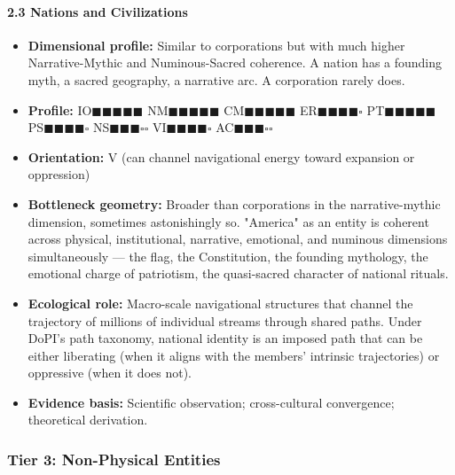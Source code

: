 \paragraph*{2.3 Nations and Civilizations}

\begin{itemize}[nosep,leftmargin=*]
  \item \textbf{Dimensional profile:} Similar to corporations but with much higher Narrative-Mythic and Numinous-Sacred coherence. A nation has a founding myth, a sacred geography, a narrative arc. A corporation rarely does.
  \item \textbf{Profile:} IO$\blacksquare$$\blacksquare$$\blacksquare$$\blacksquare$$\blacksquare$ NM$\blacksquare$$\blacksquare$$\blacksquare$$\blacksquare$$\blacksquare$ CM$\blacksquare$$\blacksquare$$\blacksquare$$\blacksquare$$\blacksquare$ ER$\blacksquare$$\blacksquare$$\blacksquare$$\blacksquare$$\square$ PT$\blacksquare$$\blacksquare$$\blacksquare$$\blacksquare$$\blacksquare$ PS$\blacksquare$$\blacksquare$$\blacksquare$$\blacksquare$$\square$ NS$\blacksquare$$\blacksquare$$\blacksquare$$\square$$\square$ VI$\blacksquare$$\blacksquare$$\blacksquare$$\blacksquare$$\square$ AC$\blacksquare$$\blacksquare$$\blacksquare$$\square$$\square$
  \item \textbf{Orientation:} V (can channel navigational energy toward expansion or oppression)
  \item \textbf{Bottleneck geometry:} Broader than corporations in the narrative-mythic dimension, sometimes astonishingly so. "America" as an entity is coherent across physical, institutional, narrative, emotional, and numinous dimensions simultaneously — the flag, the Constitution, the founding mythology, the emotional charge of patriotism, the quasi-sacred character of national rituals.
  \item \textbf{Ecological role:} Macro-scale navigational structures that channel the trajectory of millions of individual streams through shared paths. Under DoPI's path taxonomy, national identity is an imposed path that can be either liberating (when it aligns with the members' intrinsic trajectories) or oppressive (when it does not).
  \item \textbf{Evidence basis:} Scientific observation; cross-cultural convergence; theoretical derivation.
\end{itemize}


\bigskip\noindent\makebox[\textwidth]{\color{rulegray}\rule{5cm}{0.3pt}}\bigskip


\subsubsection*{Tier 3: Non-Physical Entities}


